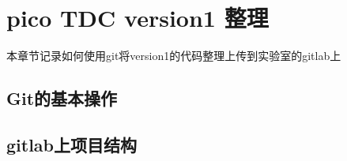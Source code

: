 \chapter{pico TDC version1 整理}
本章节记录如何使用git将version1的代码整理上传到实验室的gitlab上
\section{Git的基本操作}

\section{gitlab上项目结构}